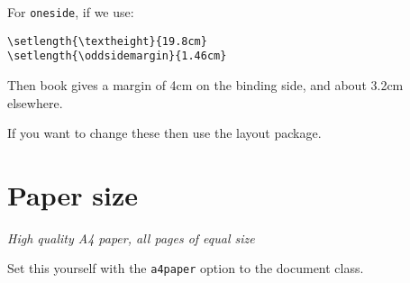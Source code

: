 For \verb+oneside+, if we use:
\begin{verbatim}
\setlength{\textheight}{19.8cm}
\setlength{\oddsidemargin}{1.46cm}
\end{verbatim}

Then \textsf{book} gives a margin of 4cm on the binding side, and about 3.2cm elsewhere.

If you want to change these then use the \textsf{layout} package.

\section{Paper size}
\textit{High quality A4 paper, all pages of equal size}

Set this yourself with the \verb+a4paper+ option to the document class.